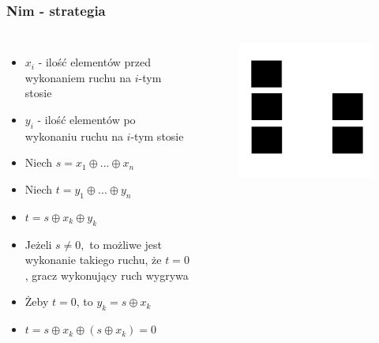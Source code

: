 \documentclass[polish,envcountsect,10pt]{beamer}
\begin{document}
                \begin{frame}
                    \frametitle{Nim - strategia}
                    \begin{columns}
                            \begin{itemize}
                                \item<1-> $x_i$ - ilość elementów przed wykonaniem ruchu na $i$-tym stosie
                                \item<1-> $y_i$ - ilość elementów po wykonaniu ruchu na $i$-tym stosie
                                \item<1-> Niech $s = x_1 \oplus ... \oplus x_n$
                                \item<1-> Niech $t = y_1 \oplus ... \oplus y_n$
                                \item<1-> $t = s \oplus x_k \oplus y_k$
                                \item<2-> Jeżeli $s \neq 0,$ to możliwe jest wykonanie takiego ruchu, że $t = 0$, gracz wykonujący ruch wygrywa
                                \item<3-> Żeby $t = 0$, to $y_k = s \oplus x_k$
                                \item<4-> $t = s \oplus x_k \oplus (s \oplus x_k) = 0$
                            \end{itemize}
                        \begin{figure}[H]
                            \centering
                            \includegraphics[width=\textwidth]{images/nimsuma1.jpg}                            
                        \end{figure}
                \end{columns}
                 
                \end{frame}
\end{document}
